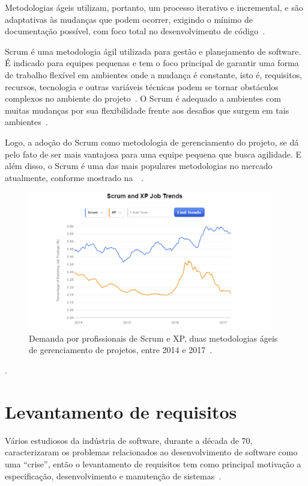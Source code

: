 Metodologias ágeis utilizam, portanto, um processo iterativo e incremental, e são adaptativas às mudanças que podem ocorrer, exigindo o mínimo de documentação possível, com foco total no desenvolvimento de código~\cite{vargas2014manual}.

Scrum é uma metodologia ágil utilizada para gestão e planejamento de software.
É indicado para equipes pequenas e tem o foco principal de garantir uma forma de trabalho flexível em ambientes onde a mudança é constante, isto é, requisitos, recursos, tecnologia e outras variáveis técnicas podem se tornar obstáculos complexos no ambiente do projeto~\cite{dos2004metodologias}.
O Scrum é adequado a ambientes com muitas mudanças por sua flexibilidade frente aos desafios que surgem em tais ambientes~\cite{dos2004metodologias}.

Logo, a adoção do Scrum como metodologia de gerenciamento do projeto, se dá pelo fato de ser mais vantajosa para uma equipe pequena que busca agilidade.
E além disso, o Scrum é uma das mais populares metodologias no mercado atualmente, conforme mostrado na~~\cite{paulk2013scrum}.

\begin{figure}[htbp]
    \centering
    \includegraphics[width=0.95\textwidth]{figuras/figura001.png}
    \caption[Figura 1]{Demanda por profissionais de Scrum e XP, duas metodologias ágeis de gerenciamento de projetos, entre 2014 e 2017~\cite{mazuco2017percepccoes}.}
    \label{Figura001}
\end{figure}.

\section{Levantamento de requisitos}

Vários estudiosos da indústria de software, durante a década de 70, caracterizaram os problemas relacionados ao desenvolvimento de software como uma ``crise'', então o levantamento de requisitos tem como principal motivação a especificação, desenvolvimento e manutenção de sistemas~\cite{sommerville2007engenharia}.

